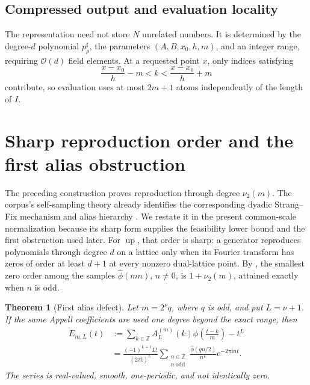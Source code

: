 \documentclass[11pt,oneside]{article}
\newtheorem{theorem}{Theorem}[section]
\theoremstyle{definition}
\theoremstyle{remark}
\newcommand{\Z}{\mathbb Z}
\newcommand{\Up}{\operatorname{up}}
\newcommand{\vtwo}{\nu_2}
\newcommand{\e}{\mathrm e}
\newcommand{\ii}{\mathrm i}
\newcommand{\bigO}{\mathcal O}
\begin{document}
\subsection{Compressed output and evaluation locality}

The representation need not store \(N\) unrelated numbers.  It is determined
by the degree-\(d\) polynomial \(p_\rho^\sharp\), the parameters
\((A,B,x_0,h,m)\), and an integer range, requiring \(\bigO(d)\) field elements.
At a requested point \(x\), only indices satisfying
\[
 \frac{x-x_0}{h}-m<k<\frac{x-x_0}{h}+m
\]
contribute, so evaluation uses at most \(2m+1\) atoms independently of the
length of \(I\).

\section{Sharp reproduction order and the first alias obstruction}
\label{sec:sharp-order}

The preceding construction proves reproduction through degree \(\vtwo(m)\).
The corpus's self-sampling theory already identifies the corresponding dyadic
Strang--Fix mechanism and alias hierarchy \cite{repo-sampling}.  We restate it
in the present common-scale normalization because its sharp form supplies the
feasibility lower bound and the first obstruction used later.  For \(\Up\),
that order is sharp: a generator reproduces polynomials through degree
\(d\) on a lattice only when its Fourier transform has zeros of order at least
\(d+1\) at every nonzero dual-lattice point.  By , the
smallest zero order among the samples \(\widehat\phi(mn)\), \(n\ne0\), is
\(1+\vtwo(m)\), attained exactly when \(n\) is odd.

\begin{theorem}[First alias defect]
\label{thm:first-defect}
Let \(m=2^\nu q\), where \(q\) is odd, and put \(L=\nu+1\).  If the same
Appell coefficients are used one degree beyond the exact range, then
\begin{equation}
 \begin{split}
 E_{m,L}(t)
 &:=\sum_{k\in\Z}A_L^{(m)}(k)
        \phi\!\left(\frac{t-k}{m}\right)-t^L\\
 &=\frac{(-1)^{L+1}L!}{(2\pi\ii)^L}
   \sum_{\substack{n\in\Z\\ n\ \mathrm{odd}}}
   \frac{\widehat\phi(qn/2)}{n^L}\e^{-2\pi\ii nt}.
 \end{split}
 \label{eq:first-defect}
\end{equation}
The series is real-valued, smooth, one-periodic, and not identically zero.
\end{theorem}
\end{document}
